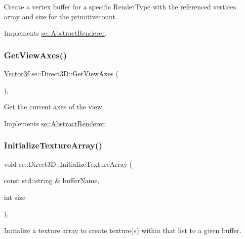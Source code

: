 Create a vertex buffer for a specific Render\+Type with the referenced vertices array and size for the primitivecount. 

Implements \mbox{\hyperlink{classse_1_1_abstract_renderer_a953d57d04771acae78c3725bee3639d4}{se\+::\+Abstract\+Renderer}}.

\mbox{\label{classse_1_1_direct3_d_a74d6926ba18dac6ce23c7dea433de7bd}} 
\subsubsection{\texorpdfstring{Get\+View\+Axes()}{GetViewAxes()}}
{\footnotesize\ttfamily \mbox{\hyperlink{namespacese_a12e07512d95e2fdebdaf74a5ea2cf5f6}{Vector3f}} se\+::\+Direct3\+D\+::\+Get\+View\+Axes (\begin{DoxyParamCaption}{ }\end{DoxyParamCaption})\hspace{0.3cm}{\ttfamily [override]}, {\ttfamily [virtual]}}

Get the current axes of the view. 

Implements \mbox{\hyperlink{classse_1_1_abstract_renderer_a8af4c1bef5cf120f6160f5d93dd74207}{se\+::\+Abstract\+Renderer}}.

\mbox{\label{classse_1_1_direct3_d_a7d5db09c1cf0c5c45f61c631b174fcf2}} 
\subsubsection{\texorpdfstring{Initialize\+Texture\+Array()}{InitializeTextureArray()}}
{\footnotesize\ttfamily void se\+::\+Direct3\+D\+::\+Initialize\+Texture\+Array (\begin{DoxyParamCaption}\item[{const std\+::string \&}]{buffer\+Name,  }\item[{int}]{size }\end{DoxyParamCaption})\hspace{0.3cm}{\ttfamily [override]}, {\ttfamily [virtual]}}

Initialize a texture array to create texture(s) within that list to a given buffer. 

